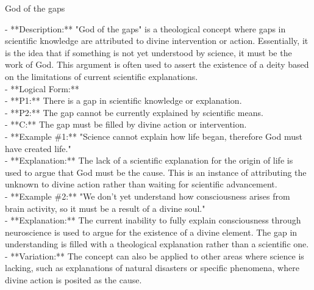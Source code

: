 \documentclass[a4paper,12pt,single,pdftex]{scrbook}
\begin{document}
  

God of the gaps
    
      - **Description:** "God of the gaps" is a theological concept where gaps in scientific knowledge are attributed to divine intervention or action. Essentially, it is the idea that if something is not yet understood by science, it must be the work of God. This argument is often used to assert the existence of a deity based on the limitations of current scientific explanations.
    \\

    
      - **Logical Form:**
    \\

    
        - **P1:** There is a gap in scientific knowledge or explanation.
    \\

    
        - **P2:** The gap cannot be currently explained by scientific means.
    \\

    
        - **C:** The gap must be filled by divine action or intervention.
    \\

    
      - **Example \#1:** "Science cannot explain how life began, therefore God must have created life."
    \\

    
      - **Explanation:** The lack of a scientific explanation for the origin of life is used to argue that God must be the cause. This is an instance of attributing the unknown to divine action rather than waiting for scientific advancement.
    \\

    
      - **Example \#2:** "We don’t yet understand how consciousness arises from brain activity, so it must be a result of a divine soul."
    \\

    
      - **Explanation:** The current inability to fully explain consciousness through neuroscience is used to argue for the existence of a divine element. The gap in understanding is filled with a theological explanation rather than a scientific one.
    \\

    
      - **Variation:** The concept can also be applied to other areas where science is lacking, such as explanations of natural disasters or specific phenomena, where divine action is posited as the cause.
    \\
\end{document}
